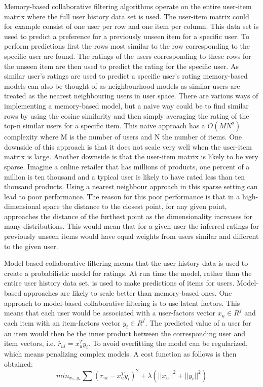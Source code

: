\documentclass[a4paper,11pt]{kth-mag}
\begin{document}
Memory-based collaborative filtering algorithms operate on the entire user-item matrix where the full user history data set is used\cite{breese1998empirical}. The user-item matrix could for example consist of one user per row and one item per column. This data set is used to predict a preference for a previously unseen item for a specific user. To perform predictions first the rows most similar to the row corresponding to the specific user are found. The ratings of the users corresponding to these rows for the unseen item are then used to predict the rating for the specific user. As similar user's ratings are used to predict a specific user's rating memory-based models can also be thought of as neighbourhood models as similar users are treated as the nearest neighbouring users in user space\cite{hu2008collaborative}. There are various ways of implementing a memory-based model, but a naive way could be to find similar rows by using the cosine similarity and then simply averaging the rating of the top-n similar users for a specific item. This naive approach has a $O(MN^2)$ complexity where M is the number of users and N the number of items. One downside of this approach is that it does not scale very well when the user-item matrix is large. Another downside is that the user-item matrix is likely to be very sparse. Imagine a online retailer that has millions of products, one percent of a million is ten thousand and a typical user is likely to have rated less than ten thousand products. Using a nearest neighbour approach in this sparse setting can lead to poor performance\cite{sarwar2001item}\cite{su2009survey}. The reason for this poor performance is that in a high-dimensional space the distance to the closest point, for any given point, approaches the distance of the furthest point as the dimensionality increases for many distributions\cite{beyer1999nearest}. This would mean that for a given user the inferred ratings for previously unseen items would have equal weights from users similar and different to the given user.

Model-based collaborative filtering means that the user history data is used to create a probabilistic model for ratings. At run time the model, rather than the entire user history data set, is used to make predictions of items for users\cite{breese1998empirical}. Model-based approaches are likely to scale better than memory-based ones\cite{sarwar2001item}. One approach to model-based collaborative filtering is to use latent factors. This means that each user would be associated with a user-factors vector $x_u \in R^f$ and each item with an item-factors vector $y_i \in R^f$. The predicted value of a user for an item would then be the inner product between the corresponding user and item vectors, i.e. $\hat{r}_{ui} = x_u^T y_i$. To avoid overfitting the model can be regularized, which means penalizing complex models. A cost function as follows is then obtained: 
\begin{equation}
min_{x_*,y_*} \sum (r_{ui} - x_u^Ty_i)^2 +  \lambda(||x_u||^2 + ||y_i||^2)
\label{corFilt1}
\end{equation}
\end{document}
